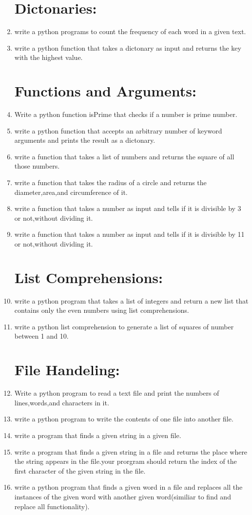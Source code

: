 \documentclass[a4paper,11pt]{article}
\theoremstyle{mytheor}
\begin{document}
\begin{enumerate}
\section{Dictonaries:}
	\item write a python programs to count the frequency of each word in a given text.
	\item write a python function that takes a dictonary as input and returns the key with the highest value.
\section{Functions and Arguments:}
	\item Write a python function isPrime that checks if a number is prime number.
	\item write a python function that accepts an arbitrary number of keyword arguments and prints the result as a dictonary.
	\item write a function that takes a list of numbers and returns the square of all those numbers.
	\item write a function that takes the radius of a circle and returns the diameter,area,and circumference of it.
	\item write a function that takes a number as input and tells if it is divisible by 3 or not,without dividing it.
	\item write a function that takes a number as input and tells if it is divisible by 11 or not,without dividing it.
\section{List Comprehensions:}
	\item write a python program that takes a list of integers and return a new list that contains only the even numbers using list comprehensions.
	\item write a python list comprehension to generate a list of squares of number between 1 and 10.

\section{File Handeling:}
	\item Write a python program to read a text file and print the numbers of lines,words,and characters in it.
	\item write a python program to write the contents of one file into another file.
	\item write a program that finds a given string in a given file.
	\item write a program that finds a given string in a file and returns the place where the string appears in the file.your prorgram should return the index of the first character of the given string in the file.
	\item write a python program that finds a given word in a file and replaces all the instances of the given word with another given word(similiar to find and replace all functionality).
	

\end{enumerate}
\end{document}
